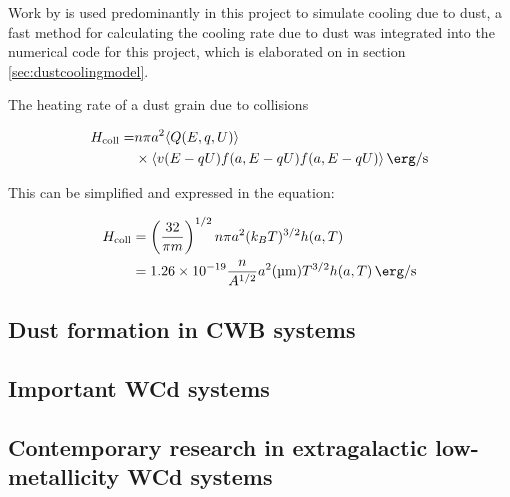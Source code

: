 Work by \cite{dwek_infrared_1981} is used predominantly in this project to simulate cooling due to dust, a fast method for calculating the cooling rate due to dust was integrated into the numerical code for this project, which is elaborated on in section \ref{sec:dustcoolingmodel}.


The heating rate of a dust grain due to collisions 

\begin{equation}
  \begin{split} 
      H_\text{coll} = & n \pi a^2 \langle Q(E,q,U) \rangle \\
      & \times \langle v (E-qU) f(a,E-qU) f(a,E-qU) \rangle \, \si{\erg\per\second}
  \end{split}
\end{equation}

This can be simplified and expressed in the equation:

\begin{equation}
  \begin{split}
    H_\text{coll} & = \left(\frac{32}{\pi m}\right)^{1/2} n\pi a^2 (k_B T)^{3/2} h(a,T) \\
    & = \num{1.26e-19} \frac{n}{A^{1/2}} a^2 (\si{\micro\metre}) T^{3/2} h(a,T) \, \si{\erg\per\second}
  \end{split}
\end{equation}







\subsection{Dust formation in CWB systems}
\label{sec:cwbdust}





\subsection{Important WCd systems}

\subsection{Contemporary research in extragalactic low-metallicity WCd systems}

\label{sec:knowndustysystems}

